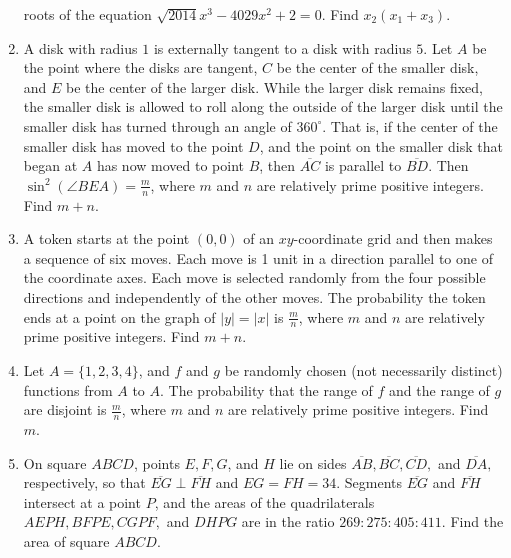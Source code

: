 \documentclass{article}
\begin{document}
\begin{enumerate}[label=\arabic*., itemsep=0.5em]
roots of the equation \(\sqrt{2014} x^3 - 4029x^2 + 2 = 0\). Find \(x_2(x_1+x_3)\).\par \vspace{0.5em}\item A disk with radius \(1\) is externally tangent to a disk with radius \(5\). Let \(A\) be the point where the disks are tangent, \(C\) be the center of the smaller disk, and \(E\) be the center of the larger disk. While the larger disk remains fixed, the smaller disk is allowed to roll along the outside of the larger disk until the smaller disk has turned through an angle of \(360^\circ\). That is, if the center of the smaller disk has moved to the point \(D\), and the point on the smaller disk that began at \(A\) has now moved to point \(B\), then \(\overline{AC}\) is parallel to \(\overline{BD}\). Then \(\sin^2(\angle BEA)=\tfrac{m}{n}\), where \(m\) and \(n\) are relatively prime positive integers. Find \(m+n\).\par \vspace{0.5em}\item A token starts at the point \((0,0)\) of an \(xy\)-coordinate grid and then makes a sequence of six moves. Each move is 1 unit in a direction parallel to one of the coordinate axes. Each move is selected randomly from the four possible directions and independently of the other moves. The probability the token ends at a point on the graph of \(|y|=|x|\) is \(\tfrac{m}{n}\), where \(m\) and \(n\) are relatively prime positive integers. Find \(m+n\).\par \vspace{0.5em}\item Let \(A=\{1,2,3,4\}\), and \(f\) and \(g\) be randomly chosen (not necessarily distinct) functions from \(A\) to \(A\). The probability that the range of \(f\) and the range of \(g\) are disjoint is \(\tfrac{m}{n}\), where \(m\) and \(n\) are relatively prime positive integers. Find \(m\).\par \vspace{0.5em}\item On square \(ABCD\), points \(E,F,G\), and \(H\) lie on sides \(\overline{AB},\overline{BC},\overline{CD},\) and \(\overline{DA},\) respectively, so that \(\overline{EG} \perp \overline{FH}\) and \(EG=FH = 34\). Segments \(\overline{EG}\) and \(\overline{FH}\) intersect at a point \(P\), and the areas of the quadrilaterals \(AEPH, BFPE, CGPF,\) and \(DHPG\) are in the ratio \(269:275:405:411.\) Find the area of square \(ABCD\).



\end{enumerate}
\end{document}
